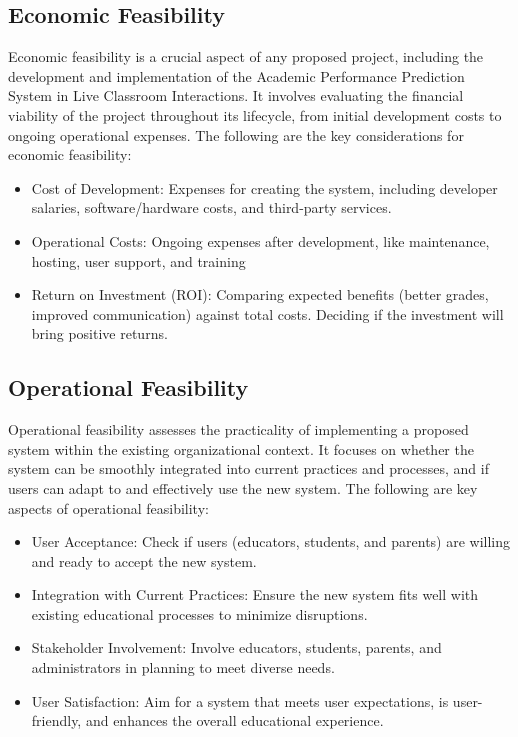 \subsection {Economic Feasibility}
\par \hspace{1cm}Economic feasibility is a crucial aspect of any proposed project, including the development and implementation of the Academic Performance Prediction System in Live Classroom Interactions. It involves evaluating the financial viability of the project throughout its lifecycle, from initial development costs to ongoing operational expenses. The following are the key considerations for economic feasibility:
\begin{itemize}
\item Cost of Development: Expenses for creating the system, including developer salaries, software/hardware costs, and third-party services.
\item Operational Costs: Ongoing expenses after development, like maintenance, hosting, user support, and training
\item Return on Investment (ROI): Comparing expected benefits (better grades, improved communication) against total costs. Deciding if the investment will bring positive returns.
\end{itemize}
\subsection {Operational Feasibility}
\par \hspace{1cm}Operational feasibility assesses the practicality of implementing a proposed system within the existing organizational context. It focuses on whether the system can be smoothly integrated into current practices and processes, and if users can adapt to and effectively use the new system. The following are key aspects of operational feasibility:
\begin{itemize}
\item User Acceptance: Check if users (educators, students, and parents) are willing and ready to accept the new system.
\item Integration with Current Practices: Ensure the new system fits well with existing educational processes to minimize disruptions.
\item Stakeholder Involvement: Involve educators, students, parents, and administrators in planning to meet diverse needs.
\item User Satisfaction: Aim for a system that meets user expectations, is user-friendly, and enhances the overall educational experience.
\end{itemize}
